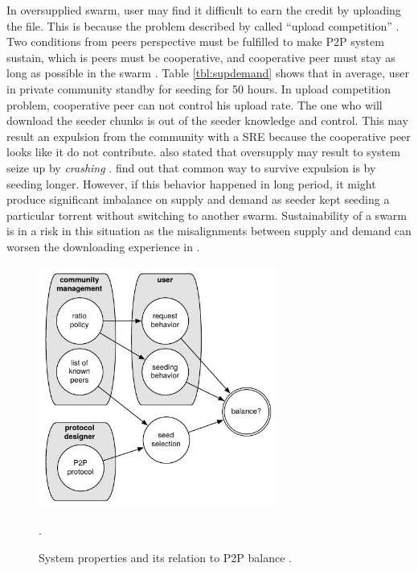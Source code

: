 In oversupplied swarm, user may find it difficult to earn the credit by uploading the file. This is because the problem described by \citeauthor{2011:managesupplydemand:meulpolder} called ``upload competition'' \cite{2011:managesupplydemand:meulpolder}. Two conditions from peers perspective must be fulfilled to make P2P system sustain, which is peers must be cooperative, and cooperative peer must stay as long as possible in the swarm \cite{2011:managesupplydemand:meulpolder}. Table \ref{tbl:supdemand} shows that in average, user in private community standby for seeding for 50 hours. In upload competition problem, cooperative peer can not control his upload rate. The one who will download the seeder chunks is out of the seeder knowledge and control. This may result an expulsion from the community with a SRE because the cooperative peer looks like it do not contribute. \citeauthor{2010:crashsustain:rahman} also stated that oversupply may result to system seize up by \textit{crashing}  \cite{2010:crashsustain:rahman}. \citeauthor{2013:survivepriv:jia} find out that common way to survive expulsion is by seeding longer. However, if this behavior happened in long period, it might produce significant imbalance on supply and demand as seeder kept seeding a particular torrent without switching to another swarm. Sustainability of a swarm is in a risk in this situation as the misalignments between supply and demand can worsen the downloading experience in \bt.

\begin{figure}[h]
	\centering
	\includegraphics[width=0.7\textwidth]{pics/p2psys_balance.pdf}
	\caption{System properties and its relation to P2P balance \cite{2011:managesupplydemand:meulpolder}.}.
	\label{fig:sysbalance}
\end{figure}

